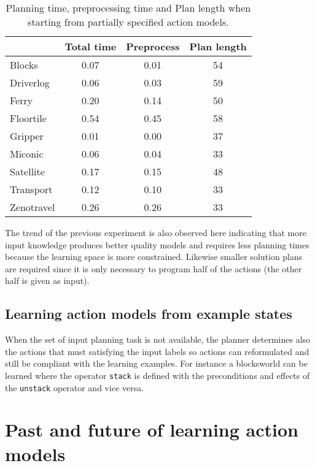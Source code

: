 \documentclass[letterpaper]{article} %
\begin{document}
\begin{table}[hbt!]
\begin{footnotesize}
	\begin{center}
		\begin{tabular}{l|c|c|c|}			
			 & Total time & Preprocess & Plan length  \\
			\hline
			Blocks & 0.07 & 0.01 & 54  \\
			Driverlog & 0.06 & 0.03 & 59 \\
			Ferry & 0.20 & 0.14 & 50 \\
			Floortile & 0.54 & 0.45 & 58 \\
			Gripper & 0.01 & 0.00 & 37 \\
			Miconic & 0.06 & 0.04 & 33  \\
			Satellite & 0.17 & 0.15 & 48 \\
			Transport & 0.12 & 0.10 & 33 \\
			Zenotravel & 0.26 & 0.26 & 33
		\end{tabular}
	\end{center}
        \end{footnotesize}
	\caption{\small Planning time, preprocessing time and Plan length when starting from partially specified action models.}
	\label{tab:time_plans_partial}	
\end{table}

The trend of the previous experiment is also observed here indicating that more input knowledge produces better quality models and requires less planning times because the learning space is more constrained. Likewise smaller solution plans are required since it is only necessary to program half of the actions (the other half is given as input).   


\subsection{Learning action models from example states}
When the set of input planning task is not available, the planner determines also the actions that must satisfying the input labels so actions can reformulated and still be compliant with the learning examples. For instance a blocksworld can be learned where the operator {\small\tt stack} is defined with the preconditions and effects of the {\small\tt unstack} operator and vice versa.



\section{Past and future of learning action models}
\end{document}
